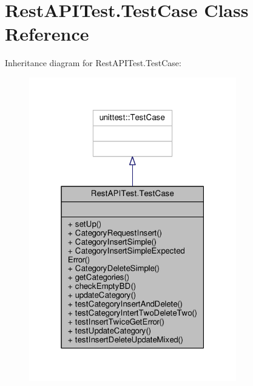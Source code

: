 \hypertarget{classRestAPITest_1_1TestCase}{}\section{Rest\+A\+P\+I\+Test.\+Test\+Case Class Reference}
\label{classRestAPITest_1_1TestCase}


Inheritance diagram for Rest\+A\+P\+I\+Test.\+Test\+Case\+:\nopagebreak
\begin{figure}[H]
\begin{center}
\leavevmode
\includegraphics[width=256pt]{d0/d14/classRestAPITest_1_1TestCase__inherit__graph}
\end{center}
\end{figure}


